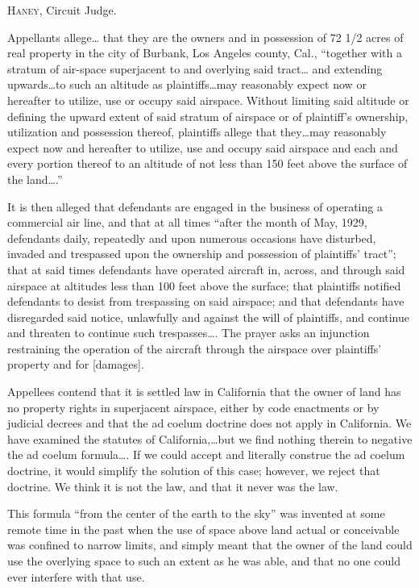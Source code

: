 

\opinion \textsc{Haney}, Circuit Judge.

Appellants allege{\dots} that they are the owners and in possession of 72 1/2
acres of real property in the city of Burbank, Los Angeles county, Cal.,
``together with a stratum of air-space superjacent to and overlying said
tract\ldots
and extending upwards\ldots to such an altitude as plaintiffs\ldots may
reasonably expect now or hereafter to utilize, use or occupy said airspace.
Without limiting said altitude or defining the upward extent of said stratum of
airspace or of plaintiff's ownership, utilization and possession thereof,
plaintiffs allege that they\ldots may reasonably expect now and hereafter to
utilize, use and occupy said airspace and each and every portion thereof to an
altitude of not less than 150 feet above the surface of the land\ldots.''

It is then alleged that defendants are engaged in the business of operating a
commercial air line, and that at all times ``after the month of May, 1929,
defendants daily, repeatedly and upon numerous occasions have disturbed,
invaded and trespassed upon the ownership and possession of plaintiffs'
tract''; that at said times defendants have operated aircraft in, across, and
through said airspace at altitudes less than 100 feet above the surface; that
plaintiffs notified defendants to desist from trespassing on said airspace; and
that defendants have disregarded said notice, unlawfully and against the will
of plaintiffs, and continue and threaten to continue such trespasses\dots. 
The prayer asks an injunction restraining the operation of the aircraft through
the airspace over plaintiffs' property and for [damages].

Appellees contend that it is settled law in California that the owner of land
has no property rights in superjacent airspace, either by code enactments or by
judicial decrees and that the ad coelum doctrine does not apply in California.
We have examined the statutes of California,\dots but we find nothing therein
to negative the ad coelum formula\dots. If we could accept and literally
construe the ad coelum doctrine, it would simplify the solution of this case;
however, we reject that doctrine. We think it is not the law, and that it never
was the law.

This formula ``from the center of the earth to the sky'' was invented at some
remote time in the past when the use of space above land actual or conceivable
was confined to narrow limits, and simply meant that the owner of the land
could use the overlying space to such an extent as he was able, and that no one
could ever interfere with that use.

